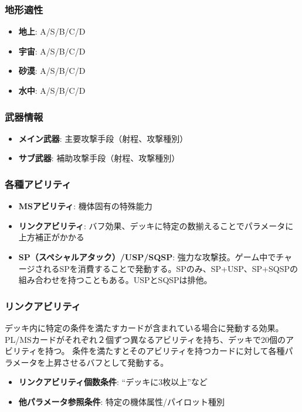 \subsubsection*{地形適性}
\begin{itemize}
    \item \textbf{地上}: A/S/B/C/D
    \item \textbf{宇宙}: A/S/B/C/D
    \item \textbf{砂漠}: A/S/B/C/D
    \item \textbf{水中}: A/S/B/C/D
\end{itemize}

\subsubsection*{武器情報}
\begin{itemize}
    \item \textbf{メイン武器}: 主要攻撃手段（射程、攻撃種別）
    \item \textbf{サブ武器}: 補助攻撃手段（射程、攻撃種別）
\end{itemize}

\subsubsection*{各種アビリティ}
\begin{itemize}
    \item \textbf{MSアビリティ}: 機体固有の特殊能力
    \item \textbf{リンクアビリティ}: バフ効果、デッキに特定の数揃えることでパラメータに上方補正がかかる
    \item \textbf{SP（スペシャルアタック）/USP/SQSP}: 強力な攻撃技。ゲーム中でチャージされるSPを消費することで発動する。SPのみ、SP+USP、SP+SQSPの組み合わせを持つこともある。USPとSQSPは排他。
\end{itemize}

\subsubsection*{リンクアビリティ}
デッキ内に特定の条件を満たすカードが含まれている場合に発動する効果。PL/MSカードがそれぞれ２個ずつ異なるアビリティを持ち、デッキで20個のアビリティを持つ。
条件を満たすとそのアビリティを持つカードに対して各種パラメータを上昇させるバフとして発動する。
\begin{itemize}
    \item \textbf{リンクアビリティ個数条件}: ``デッキに3枚以上''など
    \item \textbf{他パラメータ参照条件}: 特定の機体属性/パイロット種別
\end{itemize}

